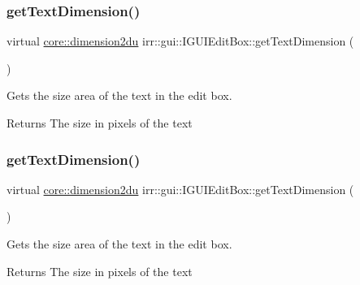 \subsubsection{\texorpdfstring{get\+Text\+Dimension()}{getTextDimension()}\hspace{0.1cm}{\footnotesize\ttfamily [1/2]}}
{\footnotesize\ttfamily virtual \hyperlink{namespaceirr_1_1core_a13e5bd7e47b2014eefc870ede11bbbbc}{core\+::dimension2du} irr\+::gui\+::\+I\+G\+U\+I\+Edit\+Box\+::get\+Text\+Dimension (\begin{DoxyParamCaption}{ }\end{DoxyParamCaption})\hspace{0.3cm}{\ttfamily [pure virtual]}}



Gets the size area of the text in the edit box. 

\begin{DoxyReturn}{Returns}
The size in pixels of the text 
\end{DoxyReturn}
\mbox{\label{classirr_1_1gui_1_1IGUIEditBox_ac993c4647168460c68d56527ba213b9c}} 
\subsubsection{\texorpdfstring{get\+Text\+Dimension()}{getTextDimension()}\hspace{0.1cm}{\footnotesize\ttfamily [2/2]}}
{\footnotesize\ttfamily virtual \hyperlink{namespaceirr_1_1core_a13e5bd7e47b2014eefc870ede11bbbbc}{core\+::dimension2du} irr\+::gui\+::\+I\+G\+U\+I\+Edit\+Box\+::get\+Text\+Dimension (\begin{DoxyParamCaption}{ }\end{DoxyParamCaption})\hspace{0.3cm}{\ttfamily [pure virtual]}}



Gets the size area of the text in the edit box. 

\begin{DoxyReturn}{Returns}
The size in pixels of the text 
\end{DoxyReturn}
\mbox{\label{classirr_1_1gui_1_1IGUIEditBox_a4ccf066d1198f3548c7d04622067917f}} 
